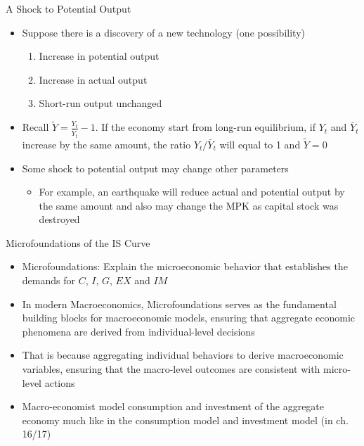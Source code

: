 \documentclass[aspectratio=1610]{beamer}
\begin{document}
\begin{frame}[wide]{A Shock to Potential Output}
	\begin{itemize}
		\item Suppose there is a discovery of a new technology (one possibility)
		\begin{enumerate}
			\item Increase in potential output
			\item Increase in actual output
			\item Short-run output unchanged
		\end{enumerate}
		\vspace{4mm}
		\item Recall $\tilde{Y} = \frac{Y_t}{\bar{Y}_t} - 1$. If the economy start from long-run equilibrium, if $Y_t$ and $\bar{Y}_t$ increase by the same amount, the ratio $Y_t/\bar{Y}_t$ will equal to 1 and $\tilde{Y} = 0$
		\vspace{3mm}
		\item Some shock to potential output may change other parameters
		\vspace{2mm}
		\begin{itemize}
			\item For example, an earthquake will reduce actual and potential output by the same amount and also may change the MPK as capital stock was destroyed
		\end{itemize}
	\end{itemize}
\end{frame}

\begin{frame}[wide]{Microfoundations of the IS Curve}
	\begin{itemize}
		\item Microfoundations:	Explain the microeconomic behavior that establishes the demands for $C$, $I$, $G$, $EX$ and $IM$
		\vspace{3mm}
		\item In modern Macroeconomics, Microfoundations serves as the fundamental building blocks for macroeconomic models, ensuring that aggregate economic phenomena are derived from individual-level decisions
		\vspace{3mm}
		\item That is because aggregating individual behaviors to derive macroeconomic variables, ensuring that the macro-level outcomes are consistent with micro-level actions
		\vspace{3mm}
		\item Macro-economist model consumption and investment of the aggregate economy much like in the consumption model and investment model (in ch. 16/17)
		
	\end{itemize}
\end{frame}
\end{document}
